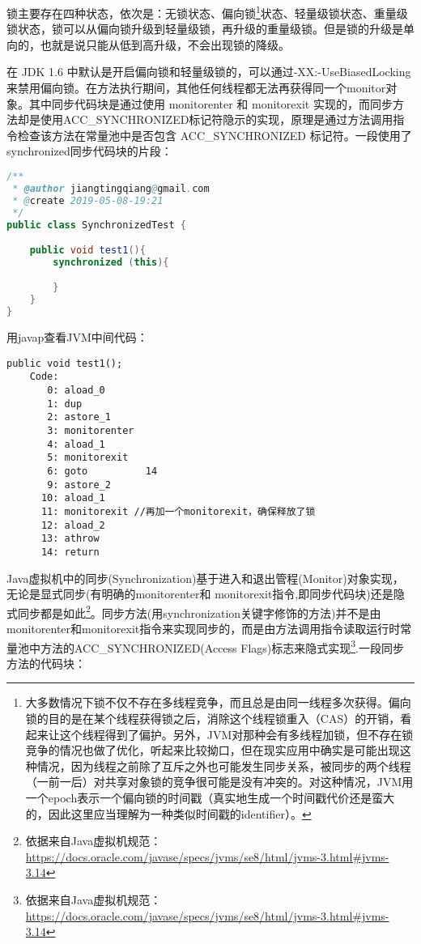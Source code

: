 \documentclass[../../../interview-questions.tex]{subfiles}
\begin{document}
锁主要存在四种状态，依次是：无锁状态、偏向锁\footnote{大多数情况下锁不仅不存在多线程竞争，而且总是由同一线程多次获得。偏向锁的目的是在某个线程获得锁之后，消除这个线程锁重入（CAS）的开销，看起来让这个线程得到了偏护。另外，JVM对那种会有多线程加锁，但不存在锁竞争的情况也做了优化，听起来比较拗口，但在现实应用中确实是可能出现这种情况，因为线程之前除了互斥之外也可能发生同步关系，被同步的两个线程（一前一后）对共享对象锁的竞争很可能是没有冲突的。对这种情况，JVM用一个epoch表示一个偏向锁的时间戳（真实地生成一个时间戳代价还是蛮大的，因此这里应当理解为一种类似时间戳的identifier）。}状态、轻量级锁状态、重量级锁状态，锁可以从偏向锁升级到轻量级锁，再升级的重量级锁。但是锁的升级是单向的，也就是说只能从低到高升级，不会出现锁的降级。

在 JDK 1.6 中默认是开启偏向锁和轻量级锁的，可以通过-XX:-UseBiasedLocking来禁用偏向锁。在方法执行期间，其他任何线程都无法再获得同一个monitor对象。其中同步代码块是通过使用 monitorenter 和 monitorexit 实现的，而同步方法却是使用ACC\_SYNCHRONIZED标记符隐示的实现，原理是通过方法调用指令检查该方法在常量池中是否包含 ACC\_SYNCHRONIZED 标记符。一段使用了synchronized同步代码块的片段：

\begin{lstlisting}[language=Java]
/**
 * @author jiangtingqiang@gmail.com
 * @create 2019-05-08-19:21
 */
public class SynchronizedTest {

    public void test1(){
        synchronized (this){

        }
    }
}
\end{lstlisting}

用javap查看JVM中间代码：

\begin{lstlisting}
public void test1();
    Code:
       0: aload_0
       1: dup
       2: astore_1
       3: monitorenter
       4: aload_1
       5: monitorexit
       6: goto          14
       9: astore_2
      10: aload_1
      11: monitorexit //再加一个monitorexit，确保释放了锁
      12: aload_2
      13: athrow
      14: return
\end{lstlisting}

Java虚拟机中的同步(Synchronization)基于进入和退出管程(Monitor)对象实现，无论是显式同步(有明确的monitorenter和 monitorexit指令,即同步代码块)还是隐式同步都是如此\footnote{依据来自Java虚拟机规范：\url{https://docs.oracle.com/javase/specs/jvms/se8/html/jvms-3.html\#jvms-3.14}}。同步方法(用synchronization关键字修饰的方法)并不是由monitorenter和monitorexit指令来实现同步的，而是由方法调用指令读取运行时常量池中方法的ACC\_SYNCHRONIZED(Access Flags)标志来隐式实现\footnote{依据来自Java虚拟机规范：\url{https://docs.oracle.com/javase/specs/jvms/se8/html/jvms-3.html\#jvms-3.14}}.一段同步方法的代码块：
\end{document}
